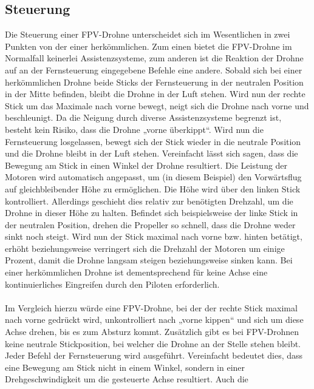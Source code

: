     \newpage
    \subsection[Steuerung]{Steuerung}
        Die Steuerung einer FPV-Drohne unterscheidet sich im Wesentlichen in zwei Punkten von der einer
        herkömmlichen. Zum einen bietet die FPV-Drohne im Normalfall keinerlei Assistenzsysteme, zum anderen
        ist die Reaktion der Drohne auf an der Fernsteuerung eingegebene Befehle eine andere. Sobald sich
        bei einer herkömmlichen Drohne beide Sticks der Fernsteuerung in der neutralen Position in der Mitte
        befinden, bleibt die Drohne in der Luft stehen. Wird nun der rechte Stick um das Maximale nach vorne
        bewegt, neigt sich die Drohne nach vorne und beschleunigt. Da die Neigung durch diverse Assistenzsysteme
        begrenzt ist, besteht kein Risiko, dass die Drohne „vorne überkippt“. Wird nun die Fernsteuerung
        losgelassen, bewegt sich der Stick wieder in die neutrale Position und die Drohne bleibt in der Luft
        stehen. Vereinfacht lässt sich sagen, dass die Bewegung am Stick in einen Winkel der Drohne resultiert.
        Die Leistung der Motoren wird automatisch angepasst, um (in diesem Beispiel) den Vorwärtsflug auf
        gleichbleibender Höhe zu ermöglichen. Die Höhe wird über den linken Stick kontrolliert. Allerdings
        geschieht dies relativ zur benötigten Drehzahl, um die Drohne in dieser Höhe zu halten. Befindet sich
        beispielsweise der linke Stick in der neutralen Position, drehen die Propeller so schnell, dass die
        Drohne weder sinkt noch steigt. Wird nun der Stick maximal nach vorne bzw. hinten betätigt, erhöht
        beziehungsweise verringert sich die Drehzahl der Motoren um einige Prozent, damit die Drohne langsam
        steigen beziehungsweise sinken kann. Bei einer herkömmlichen Drohne ist dementsprechend für keine Achse
        eine kontinuierliches Eingreifen durch den Piloten erforderlich. \\
        \\
        Im Vergleich hierzu würde eine FPV-Drohne, bei der der rechte Stick maximal nach vorne gedrückt wird,
        unkontrolliert nach „vorne kippen“ und sich um diese Achse drehen, bis es zum Absturz kommt. Zusätzlich
        gibt es bei FPV-Drohnen keine neutrale Stickposition, bei welcher die Drohne an der Stelle stehen bleibt.
        Jeder Befehl der Fernsteuerung wird ausgeführt. Vereinfacht bedeutet dies, dass eine Bewegung am Stick
        nicht in einem Winkel, sondern in einer Drehgeschwindigkeit um die gesteuerte Achse resultiert. Auch die
